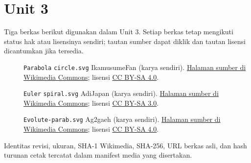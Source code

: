 \section*{Unit 3}
Tiga berkas berikut digunakan dalam Unit 3. Setiap berkas tetap mengikuti status hak atau lisensinya sendiri; tautan sumber dapat diklik dan tautan lisensi dicantumkan jika tersedia.
\begin{description}
\item[]\texttt{Parabola} \texttt{circle.svg}
IkamusumeFan (karya sendiri).
\href{https://commons.wikimedia.org/wiki/File:Parabola_circle.svg}{Halaman sumber di Wikimedia Commons}; lisensi \href{https://creativecommons.org/licenses/by-sa/4.0}{CC BY-SA 4.0}.
\item[]\texttt{Euler} \texttt{spiral.svg}
AdiJapan (karya sendiri).
\href{https://commons.wikimedia.org/wiki/File:Euler_spiral.svg}{Halaman sumber di Wikimedia Commons}; lisensi \href{https://creativecommons.org/licenses/by-sa/3.0}{CC BY-SA 3.0}.
\item[]\texttt{Evolute-parab.svg}
Ag2gaeh (karya sendiri).
\href{https://commons.wikimedia.org/wiki/File:Evolute-parab.svg}{Halaman sumber di Wikimedia Commons}; lisensi \href{https://creativecommons.org/licenses/by-sa/4.0}{CC BY-SA 4.0}.
\end{description}
Identitas revisi, ukuran, SHA-1 Wikimedia, SHA-256, URL berkas asli, dan hash turunan cetak tercatat dalam manifest media yang disertakan.
